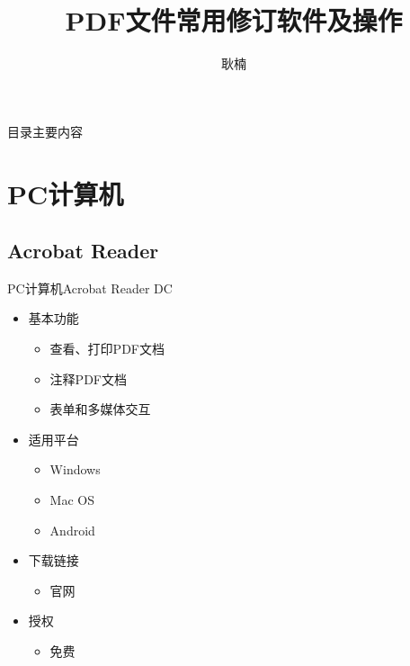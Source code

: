 \documentclass[fontset = none, t, aspectratio=169]{ctexbeamer}
\title[pdfReview]{\Large PDF文件常用修订软件及操作}
\author[N. Geng]{耿楠}
\date{\tosemester} %
\institute[教发中心]{教学发展中心\\西北农林科技大学}
\begin{document}
\begin{frame}
  \maketitle
\end{frame}


\begin{frame}{目录}{主要内容}
  \begin{multicols}{2}
    \tableofcontents
  \end{multicols}  
\end{frame}

\section{PC计算机}
\subsection{Acrobat Reader}
\begin{frame}{PC计算机}{Acrobat Reader DC}
  \begin{itemize}
  \item 基本功能
    \begin{itemize}
    \item 查看、打印PDF文档
    \item \alert{注释}PDF文档
    \item 表单和多媒体交互
    \end{itemize}
  \item 适用平台
    \begin{itemize}
    \item Windows
    \item Mac OS
    \item Android
    \end{itemize}
  \item 下载链接
    \begin{itemize}
    \item 官网
    \end{itemize}
  \item 授权
    \begin{itemize}
    \item \alert{免费}
    \end{itemize}
  \end{itemize}
\end{frame}
\end{document}

